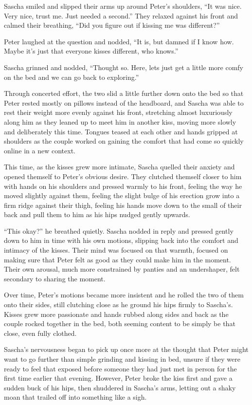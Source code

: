 Sascha smiled and slipped their arms up around Peter's shoulders, ``It was nice. Very nice, trust me. Just needed a second.'' They relaxed against his front and calmed their breathing, ``Did you figure out if kissing me was different?''

Peter laughed at the question and nodded, ``It is, but damned if I know how. Maybe it's just that everyone kisses different, who knows.''

Sascha grinned and nodded, ``Thought so. Here, lets just get a little more comfy on the bed and we can go back to exploring.''

Through concerted effort, the two slid a little further down onto the bed so that Peter rested mostly on pillows instead of the headboard, and Sascha was able to rest their weight more evenly against his front, stretching almost luxuriously along him as they leaned up to meet him in another kiss, moving more slowly and deliberately this time. Tongues teased at each other and hands gripped at shoulders as the couple worked on gaining the comfort that had come so quickly online in a new context.

This time, as the kisses grew more intimate, Sascha quelled their anxiety and opened themself to Peter's obvious desire. They clutched themself closer to him with hands on his shoulders and pressed warmly to his front, feeling the way he moved slightly against them, feeling the slight bulge of his erection grow into a firm ridge against their thigh, feeling his hands move down to the small of their back and pull them to him as his hips nudged gently upwards.

``This okay?'' he breathed quietly. Sascha nodded in reply and pressed gently down to him in time with his own motions, slipping back into the comfort and intimacy of the kisses. Their mind was focused on that warmth, focused on making sure that Peter felt as good as they could make him in the moment. Their own arousal, much more constrained by panties and an undershaper, felt secondary to sharing the moment.

Over time, Peter's motions became more insistent and he rolled the two of them onto their sides, still clutching close as he ground his hips firmly to Sascha's. Kisses grew more passionate and hands rubbed along sides and back as the couple rocked together in the bed, both seeming content to be simply be that close, even fully clothed.

Sascha's nervousness began to pick up once more at the thought that Peter might want to go further than simple grinding and kissing in bed, unsure if they were ready to feel that exposed before someone they had just met in person for the first time earlier that evening. However, Peter broke the kiss first and gave a sudden buck of his hips, then shuddered in Sascha's arms, letting out a shaky moan that trailed off into something like a sigh.

